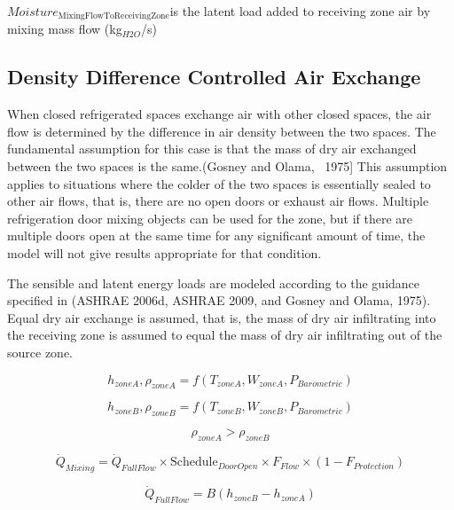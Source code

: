 \(Moistur{e_{{\mathrm{MixingFlowToReceivingZone}}}}\)is the latent load added to receiving zone air by mixing mass flow (kg\(_{H2O}\)/s)

\subsection{Density Difference Controlled Air Exchange}\label{density-difference-controlled-air-exchange}

When closed refrigerated spaces exchange air with other closed spaces, the air flow is determined by the difference in air density between the two spaces. The fundamental assumption for this case is that the mass of dry air exchanged between the two spaces is the same.(Gosney and Olama, ~1975{]} This assumption applies to situations where the colder of the two spaces is essentially sealed to other air flows, that is, there are no open doors or exhaust air flows. Multiple refrigeration door mixing objects can be used for the zone, but if there are multiple doors open at the same time for any significant amount of time, the model will not give results appropriate for that condition.

The sensible and latent energy loads are modeled according to the guidance specified in (ASHRAE 2006d, ASHRAE 2009, and Gosney and Olama, 1975).~ Equal dry air exchange is assumed, that is, the mass of dry air infiltrating into the receiving zone is assumed to equal the mass of dry air infiltrating out of the source zone.

\begin{equation}
h_{zoneA},\rho_{zoneA} = f (T_{zoneA},W_{zoneA},P_{Barometric})
\end{equation}

\begin{equation}
h_{zoneB},\rho_{zoneB} = f (T_{zoneB},W_{zoneB},P_{Barometric})
\end{equation}

\begin{equation}
\rho_{zoneA} > \rho_{zoneB}
\end{equation}

\begin{equation}
\dot{Q}_{Mixing} = \dot{Q}_{FullFlow} \times \text{Schedule}_{DoorOpen} \times F_{Flow} \times (1-F_{Protection})
\end{equation}

\begin{equation}
\dot{Q}_{FullFlow} = B (h_{zoneB}-h_{zoneA})
\end{equation}

